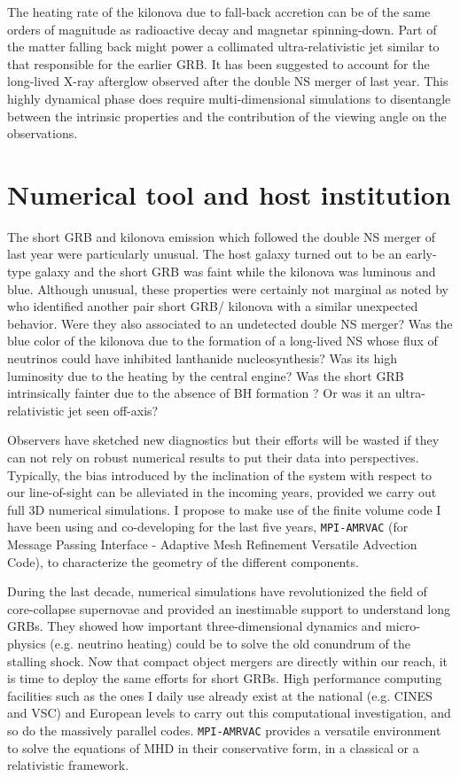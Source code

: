 \documentclass[12pt,onecolumn]{article}
\makeatletter
\newcommand{\grb}{GRB\xspace}
\newcommand{\grbs}{GRBs\xspace}
\newcommand{\mhd}{MHD\xspace}
\newcommand*{\ns}{NS\@\xspace}
\newcommand*{\bh}{BH\@\xspace}
\newcommand*{\eg}{e.g.\@\xspace}
\makeatother
\begin{document}
The heating rate of the kilonova due to fall-back accretion can be of the same orders of magnitude as radioactive decay and magnetar spinning-down. Part of the matter falling back might power a collimated ultra-relativistic jet similar to that responsible for the earlier \grb. It has been suggested to account for the long-lived X-ray afterglow observed after the double \ns merger of last year. This highly dynamical phase does require multi-dimensional simulations to disentangle between the intrinsic properties and the contribution of the viewing angle on the observations.

\section{Numerical tool and host institution}

The short \grb and kilonova emission which followed the double \ns merger of last year were particularly unusual. The host galaxy turned out to be an early-type galaxy and the short \grb was faint while the kilonova was luminous and blue. Although unusual, these properties were certainly not marginal as noted by \citet{Troja2018} who identified another pair short \grb\xspace/ kilonova with a similar unexpected behavior. Were they also associated to an undetected double \ns merger? Was the blue color of the kilonova due to the formation of a long-lived \ns whose flux of neutrinos could have inhibited lanthanide nucleosynthesis? Was its high luminosity due to the heating by the central engine? Was the short \grb intrinsically fainter due to the absence of \bh formation \citep{Murguia-Berthier2014,Murguia-Berthier2017a}? Or was it an ultra-relativistic jet seen off-axis? 

Observers have sketched new diagnostics \citep{Gill2018} but their efforts will be wasted if they can not rely on robust numerical results to put their data into perspectives. Typically, the bias introduced by the inclination of the system with respect to our line-of-sight can be alleviated in the incoming years, provided we carry out full 3D numerical simulations. I propose to make use of the finite volume code I have been using and co-developing for the last five years, \texttt{MPI-AMRVAC} (for Message Passing Interface - Adaptive Mesh Refinement Versatile Advection Code), to characterize the geometry of the different components.

During the last decade, numerical simulations have revolutionized the field of core-collapse supernovae and provided an inestimable support to understand long \grbs. They showed how important three-dimensional dynamics and micro-physics (\eg neutrino heating) could be to solve the old conundrum of the stalling shock. Now that compact object mergers are directly within our reach, it is time to deploy the same efforts for short \grbs. High performance computing facilities such as the ones I daily use already exist at the national (\eg CINES and VSC) and European levels to carry out this computational investigation, and so do the massively parallel codes. \texttt{MPI-AMRVAC} provides a versatile environment to solve the equations of \mhd in their conservative form, in a classical or a relativistic framework. 
\end{document}
